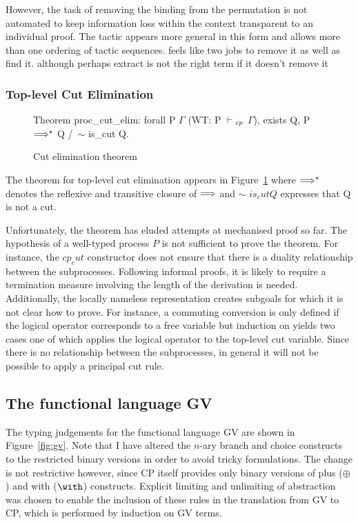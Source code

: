 However, the task of removing the binding from the permutation is not
automated to keep information loss within the context transparent to an
individual proof. The tactic appears more general in this form and allows more
than one ordering of tactic sequences. feels like two jobs to remove it as
well as find it. although perhaps extract is not the right term if it doesn't
remove it

\subsubsection{Top-level Cut Elimination}\label{sec:cutelim}

\begin{figure}
\begin{coq}
Theorem proc_cut_elim:
  forall P $\Gamma$
         (WT: P ${\color{blue} {} \vdash {}}_{cp}$ $\Gamma$),
    exists Q, P $\Longrightarrow^\star$ Q /\ $\sim$ is_cut Q.
\end{coq}
\caption{Cut elimination theorem}
\label{fig:cutelim}
\end{figure}

The theorem for top-level cut elimination appears in Figure~\ref{fig:cutelim}
where $\Longrightarrow^\star$ denotes the reflexive and transitive closure of
$\Longrightarrow$ and $\sim$ \coqe$is_cut Q$ expresses that Q is not a cut.

Unfortunately, the theorem has eluded attempts at mechanised proof so far. The
hypothesis of a well-typed process \coqe$P$ is not sufficient to prove the
theorem. For instance, the \coqe$cp_cut$ constructor does not ensure that
there is a duality relationship between the subprocesses. Following informal
proofs, it is likely to require a termination measure involving the length of
the derivation is needed. Additionally, the locally nameless representation
creates subgoals for which it is not clear how to prove. For instance, a
commuting conversion is only defined if the logical operator corresponds to a
free variable but induction on  yields two cases one of which applies
the logical operator to the top-level cut variable. Since there is no
relationship between the subprocesses, in general it will not be possible to
apply a principal cut rule.

\subsection{The functional language GV}\label{sec:gv}



The typing judgements for the functional language GV are shown in
Figure~\ref{fig:gv}. Note that I have altered the $n$-ary branch and choice
constructs to the restricted binary versions in order to avoid tricky
formulations. The change is not restrictive however, since CP itself provides
only binary versions of plus ($\oplus$) and with ($\with$)
constructs. Explicit limiting and unlimiting of abstraction was chosen to
enable the inclusion of these rules in the translation from GV to CP, which is
performed by induction on GV terms. 


